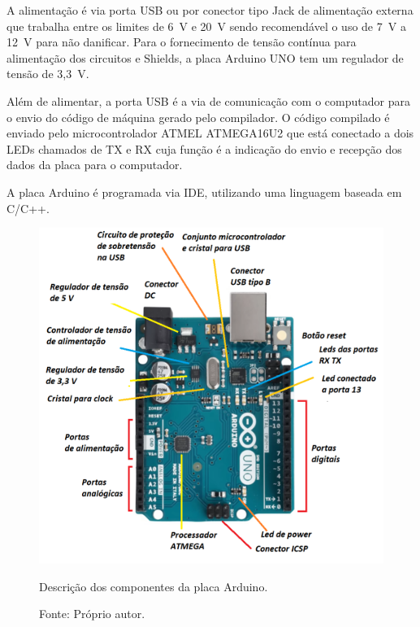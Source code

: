 A alimentação é via porta \ac{USB} ou por conector tipo Jack de alimentação externa que trabalha entre os 
limites de 6~V e 20~V sendo recomendável o uso de 7~V a 12~V para não danificar. Para o fornecimento 
de tensão contínua para alimentação dos circuitos e Shields, a placa Arduino UNO tem um regulador 
de tensão de 3,3~V.

Além de alimentar, a porta \ac{USB} é a via de comunicação com o computador para o envio do código de máquina 
gerado pelo compilador. O código compilado é enviado pelo microcontrolador ATMEL ATMEGA16U2 que está 
conectado a dois LEDs chamados de TX e RX cuja função é a indicação do envio e recepção dos dados da 
placa para o computador.

A placa Arduino é programada via \ac{IDE}, utilizando uma linguagem baseada em C/C++.

\begin{figure}[H]
\centering
\includegraphics[scale = 0.6]{figuras/placaarduino}
\caption{Descrição dos componentes da placa Arduino.}
\caption*{Fonte: Próprio autor.}
\label{fig:placaarduino}
\end{figure}
    
